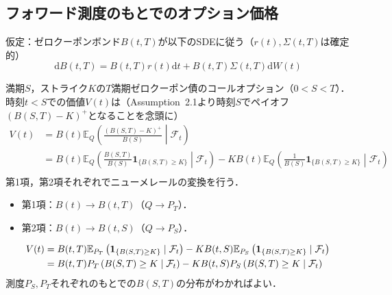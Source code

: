 \documentclass[a4paper, lualatex, ja=standard]{bxjsarticle}
\theoremstyle{theorem}
\theoremstyle{definition}
\newcommand{\F}{\mathcal{F}}
\newcommand{\E}{\mathbb{E}}
\newcommand{\I}{\mathbf{1}}
\newcommand{\diff}{\mathrm{d}}
\newcommand{\relmiddle}[1]{\mathrel{}\middle#1\mathrel{}}
\begin{document}
\subsection{フォワード測度のもとでのオプション価格}
仮定：ゼロクーポンボンド$B(t,T)$が以下のSDEに従う（$r(t),\Sigma(t,T)$は確定的）
\begin{equation}
  \diff B(t,T) = B(t,T)r(t)\diff t + B(t,T)\Sigma(t,T)\diff W(t) \tag{2.8}\label{eq:2.8}
\end{equation}

満期$S$，ストライク$K$の$T$満期ゼロクーポン債のコールオプション（$0<S<T$）． 
時刻$t<S$での価値$V(t)$は（Assumption~2.1より時刻$S$でペイオフ$(B(S,T)-K)^+$となることを念頭に）
\begin{align*}
  V(t) &= B(t)\E_Q\left(\frac{(B(S,T)-K)^+}{B(S)}\relmiddle|\F_t\right)\\
  &= B(t)\E_Q\left(\frac{B(S,T)}{B(S)}\I_{\{B(S,T)\geq K\}}\relmiddle|\F_t\right) - KB(t)\E_Q\left(\frac{1}{B(S)}\I_{\{B(S,T)\geq K\}}\relmiddle|\F_t\right)\\
\end{align*}
第1項，第2項それぞれでニューメレールの変換を行う．
\begin{itemize}
  \item 第1項：$B(t)\to B(t,T)$（$Q\to P_T$）．
  \item 第2項：$B(t)\to B(t,S)$（$Q\to P_S$）．
\end{itemize}
\begin{align}
  V(t) &= B(t,T)\E_{P_T}\left(\I_{\{B(S,T)\geq K\}}\mid\F_t\right) - KB(t,S)\E_{P_S}\left(\I_{\{B(S,T)\geq K\}}\mid\F_t\right) \notag\\
  &= B(t,T)P_T\left(B(S,T)\geq K\mid\F_t\right) - KB(t,S)P_S\left(B(S,T)\geq K\mid\F_t\right) 
\end{align}
測度$P_S,P_T$それぞれのもとでの$B(S,T)$の分布がわかればよい．
\end{document}
